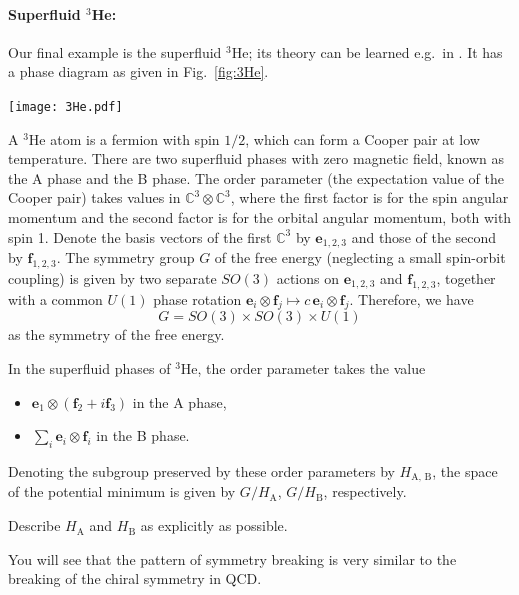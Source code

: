 \documentclass[12pt]{article}
\numberwithin{equation}{section}
\theoremstyle{remark}
\renewenvironment{figure}[1][]{
  \begin{originalfigure}[#1]
    \begin{mdframed}[linecolor=black!0,backgroundcolor=black!1]
}{
    \end{mdframed}
  \end{originalfigure}
}
\def\bC{\mathbb{C}}
\begin{document}
\paragraph{Superfluid $^3$He:}
Our final example is the superfluid $^3$He;
its theory can be learned e.g.~in \cite{SuperfluidHe3Textbook,VolovikBook}.
It has a phase diagram as given in Fig.~\ref{fig:3He}.
\begin{figure}[h]
\centering
    \texttt{[image: 3He.pdf]}
    \caption{Phase diagram of $^3$He (taken from \cite[Fig.7.1]{VolovikBook}).}
    \label{fig:3He}
\end{figure}
A $^3$He atom is a fermion with spin $1/2$, which can form a Cooper pair at low temperature.
There are two superfluid phases with zero magnetic field, known as the A phase and the B phase.
The order parameter (the expectation value of the Cooper pair) takes values in
$\bC^3\otimes \bC^3$,
where the first factor is for the spin angular momentum
and the second factor is for the orbital angular momentum,
both with spin 1.
Denote the basis vectors of the first $\bC^3$ by $\mathbf{e}_{1,2,3}$
and those of the second by $\mathbf{f}_{1,2,3}$.
The symmetry group $G$ of the free energy (neglecting a small spin-orbit coupling) is given by two separate $SO(3)$ actions on 
$\mathbf{e}_{1,2,3}$ and $\mathbf{f}_{1,2,3}$,
together with a common $U(1)$ phase rotation $\mathbf{e}_i \otimes \mathbf{f}_j \mapsto c\, \mathbf{e}_i \otimes \mathbf{f}_j$.
Therefore, we have \begin{equation}
  G = SO(3)\times SO(3)\times U(1)
\end{equation}
as the symmetry of the free energy.
\begin{example}
\label{ex:helium3}
In the superfluid phases of $^3$He, the order parameter takes the value
\begin{itemize}
\item $\mathbf{e}_1 \otimes (\mathbf{f}_2+ i\mathbf{f}_3)$ in the A phase,
\item $\sum_i \mathbf{e}_i \otimes \mathbf{f}_i$ in the B phase.
\end{itemize}
Denoting the subgroup preserved by these order parameters by $H_\text{A,  B}$,
the space of the potential minimum is given by $G/H_\text{A}$, $G/H_\text{B}$, respectively.
\end{example}

\begin{question}
Describe $H_\text{A}$ and $H_\text{B}$ as explicitly as possible.
\end{question}
You will see that the pattern of symmetry breaking is very similar to the 
breaking of the chiral symmetry in QCD.
\end{document}
